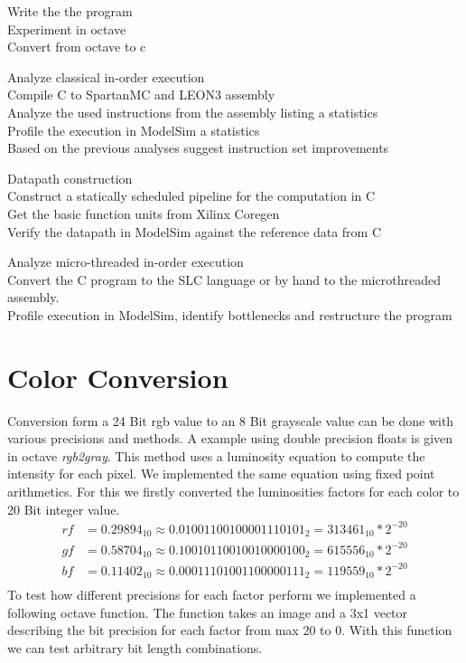 \documentclass[a4paper]{scrartcl}
\begin{document}
	\begin{description}
		\item Write the the program \\
		Experiment in octave \\
		Convert from octave to c \\
		
		\item Analyze classical in-order execution \\
		Compile C to SpartanMC and LEON3 assembly \\
		Analyze the used instructions from the assembly listing a statistics \\
		Profile the execution in ModelSim a statistics \\
		Based on the previous analyses suggest instruction set improvements \\
		
		\item Datapath construction \\
		Construct a statically scheduled pipeline for the computation in C \\
		Get the basic function units from Xilinx Coregen \\
		Verify the datapath in ModelSim against the reference data from C\\
		
		\item Analyze micro-threaded in-order execution \\
		Convert the C program to the SLC language or by hand to the microthreaded assembly. \\
		Profile execution in ModelSim, identify bottlenecks and restructure the program \\
	\end{description}
	
	\section{Color Conversion}
	Conversion form a 24 Bit rgb value to an 8 Bit grayscale value can be done with various precisions and methods. A example using double precision floats is given in octave \textit{rgb2gray}. This method uses a luminosity equation to compute the intensity for each pixel. We implemented the same equation using fixed point arithmetics. For this we firstly converted the luminosities factors for each color to 20 Bit integer value.
	\begin{align*}
		rf &= 0.29894_{10} \approx  0.01001100100001110101_{2} = 313461_{10} * 2^{-20} \\
		gf &= 0.58704_{10} \approx  0.10010110010010000100_{2} = 615556_{10} * 2^{-20} \\
		bf &= 0.11402_{10} \approx  0.00011101001100000111_{2} = 119559_{10} * 2^{-20} \\
	\end{align*}
	To test how different precisions for each factor perform we implemented a following octave function. The function takes an image and a 3x1 vector describing the bit precision for each factor from max 20 to 0. With this function we can test arbitrary bit length combinations.
\end{document}
